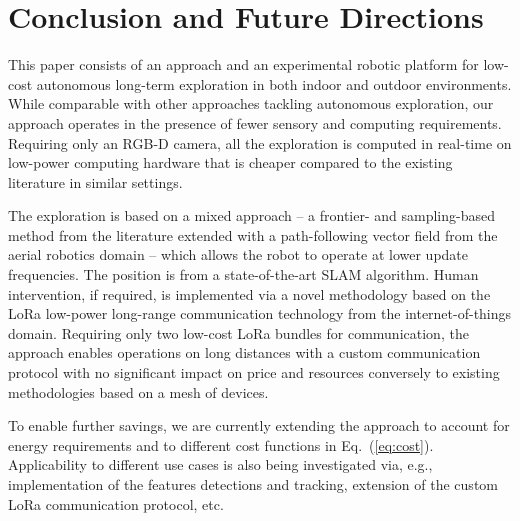 \documentclass[letterpaper,10pt,conference,twoside]{IEEEtran}
\theoremstyle{definition}
\begin{document}
\section{Conclusion and Future Directions}
\label{sec:cf}
\noindent
This paper consists of an %
approach and an experimental robotic platform 
for low-cost autonomous long-term exploration in both indoor and outdoor %
environments. While comparable with other %
approaches tackling autonomous exploration, %
our approach %
operates in the presence of fewer sensory and computing requirements. Requiring only an RGB-D camera, all the exploration is computed in real-time on low-power computing hardware that is cheaper compared to the existing literature %
in similar settings.%

The exploration is based on a %
mixed approach -- a frontier- and sampling-based method from the literature 
extended with a path-following vector field %
from the aerial robotics domain 
-- which allows the robot to operate at lower update frequencies. The position is from a state-of-the-art SLAM algorithm. %
Human intervention, if required, is implemented via a novel methodology based on the LoRa low-power long-range communication technology %
from the internet-of-things domain. 
Requiring only two low-cost LoRa bundles for communication, the approach enables operations on long distances with a custom communication protocol with no significant impact on price and resources conversely to existing methodologies based on a mesh of devices. %

To enable further savings, we are currently extending the approach to account for energy requirements and to %
different cost functions in Eq.~(\ref{eq:cost}). Applicability to different use cases is also being investigated via, e.g., implementation of the features detections and tracking, extension of the custom LoRa communication protocol, etc. %
\end{document}
